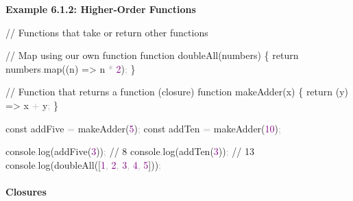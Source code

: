 \documentclass[
  justified,
  openright,
]{tufte-book}
\let\subsubsection\paragraph
\let\paragraph\paragraph
\newcommand{\BuiltInTok}[1]{#1}
\newcommand{\CommentTok}[1]{\textcolor{MidGray}{#1}}
\newcommand{\ControlFlowTok}[1]{\textcolor{BrandBlue}{#1}}
\newcommand{\DecValTok}[1]{\textcolor{Purple}{#1}}
\newcommand{\FunctionTok}[1]{\textcolor{BrandBlue}{#1}}
\newcommand{\KeywordTok}[1]{\textcolor{BrandBlue}{#1}}
\newcommand{\NormalTok}[1]{#1}
\newcommand{\OperatorTok}[1]{\textcolor{DarkGray}{#1}}
\newenvironment{Shaded}{%
  \begin{snugshade}
}{%
  \end{snugshade}
}
\let\subsubsection\paragraph
\let\paragraph\paragraph
\begin{document}
\textbf{Example 6.1.2: Higher-Order Functions}

\begin{Shaded}
\begin{Highlighting}[]
\CommentTok{// Functions that take or return other functions}

\CommentTok{// Map using our own function}
\KeywordTok{function} \FunctionTok{doubleAll}\NormalTok{(numbers) \{}
  \ControlFlowTok{return}\NormalTok{ numbers}\OperatorTok{.}\FunctionTok{map}\NormalTok{((n) }\KeywordTok{=\textgreater{}}\NormalTok{ n }\OperatorTok{*} \DecValTok{2}\NormalTok{)}\OperatorTok{;}
\NormalTok{\}}

\CommentTok{// Function that returns a function (closure)}
\KeywordTok{function} \FunctionTok{makeAdder}\NormalTok{(x) \{}
  \ControlFlowTok{return}\NormalTok{ (y) }\KeywordTok{=\textgreater{}}\NormalTok{ x }\OperatorTok{+}\NormalTok{ y}\OperatorTok{;}
\NormalTok{\}}

\KeywordTok{const}\NormalTok{ addFive }\OperatorTok{=} \FunctionTok{makeAdder}\NormalTok{(}\DecValTok{5}\NormalTok{)}\OperatorTok{;}
\KeywordTok{const}\NormalTok{ addTen }\OperatorTok{=} \FunctionTok{makeAdder}\NormalTok{(}\DecValTok{10}\NormalTok{)}\OperatorTok{;}

\BuiltInTok{console}\OperatorTok{.}\FunctionTok{log}\NormalTok{(}\FunctionTok{addFive}\NormalTok{(}\DecValTok{3}\NormalTok{))}\OperatorTok{;} \CommentTok{// 8}
\BuiltInTok{console}\OperatorTok{.}\FunctionTok{log}\NormalTok{(}\FunctionTok{addTen}\NormalTok{(}\DecValTok{3}\NormalTok{))}\OperatorTok{;} \CommentTok{// 13}
\BuiltInTok{console}\OperatorTok{.}\FunctionTok{log}\NormalTok{(}\FunctionTok{doubleAll}\NormalTok{([}\DecValTok{1}\OperatorTok{,} \DecValTok{2}\OperatorTok{,} \DecValTok{3}\OperatorTok{,} \DecValTok{4}\OperatorTok{,} \DecValTok{5}\NormalTok{]))}\OperatorTok{;}
\end{Highlighting}
\end{Shaded}

\subsubsection{Closures}\label{closures}
\end{document}
